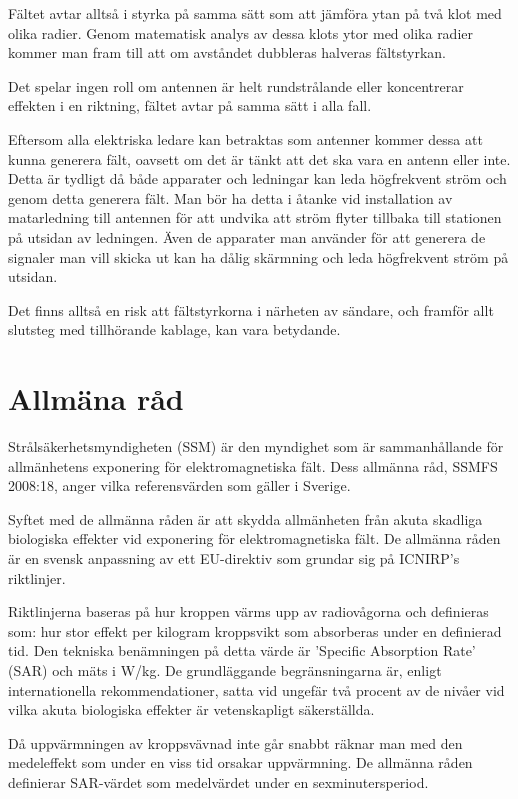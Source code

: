 Fältet avtar alltså i styrka på samma sätt som att jämföra ytan på två
klot med olika radier. Genom matematisk analys av dessa klots ytor med
olika radier kommer man fram till att om avståndet dubbleras halveras
fältstyrkan.

Det spelar ingen roll om antennen är helt rundstrålande eller
koncentrerar effekten i en riktning, fältet avtar på samma sätt i
alla fall.

Eftersom alla elektriska ledare kan betraktas som antenner kommer
dessa att kunna generera fält, oavsett om det är tänkt att det ska
vara en antenn eller inte. Detta är tydligt då både apparater och
ledningar kan leda högfrekvent ström och genom detta generera fält.
Man bör ha detta i åtanke vid installation av matarledning till
antennen för att undvika att ström flyter tillbaka till stationen på
utsidan av ledningen. Även de apparater man använder för att generera
de signaler man vill skicka ut kan ha dålig skärmning och leda
högfrekvent ström på utsidan.

Det finns alltså en risk att fältstyrkorna i närheten av sändare, och
framför allt slutsteg med tillhörande kablage, kan vara betydande.

\section{Allmäna råd}

Strålsäkerhetsmyndigheten (SSM) är den myndighet som är sammanhållande
för allmänhetens exponering för elektromagnetiska fält. Dess allmänna
råd, SSMFS 2008:18, anger vilka referensvärden som gäller i Sverige.

Syftet med de allmänna råden är att skydda allmänheten från akuta
skadliga biologiska effekter vid exponering för elektromagnetiska fält.
De allmänna råden är en svensk anpassning av ett EU-direktiv som
grundar sig på ICNIRP’s riktlinjer.

Riktlinjerna baseras på hur kroppen värms upp av radiovågorna och
definieras som: hur stor effekt per kilogram kroppsvikt som absorberas
under en definierad tid. Den tekniska benämningen på detta värde är
'Specific Absorption Rate' (SAR) och mäts i W/kg.
De grundläggande begränsningarna är, enligt internationella
rekommendationer, satta vid ungefär två procent av de nivåer vid
vilka akuta biologiska effekter är vetenskapligt säkerställda.

Då uppvärmningen av kroppsvävnad inte går snabbt räknar man med den
medeleffekt som under en viss tid orsakar uppvärmning. De allmänna
råden definierar SAR-värdet som medelvärdet under en sexminutersperiod.


